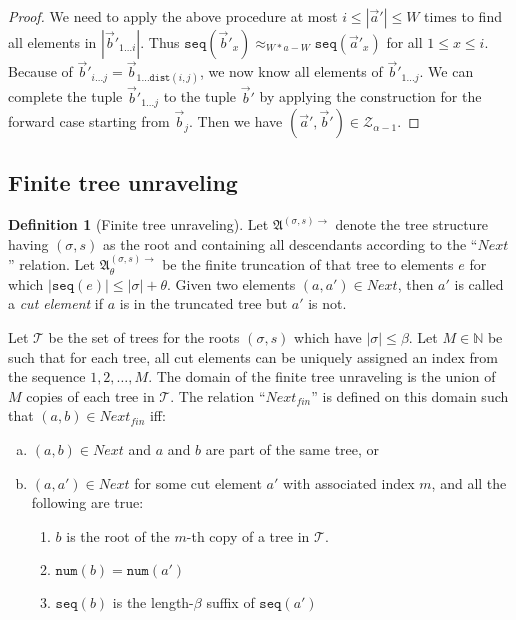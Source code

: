 \documentclass[draft]{scrartcl}
\theoremstyle{definition}
\newtheorem{definition}[theorem]{Definition}
\newcommand{\seq}[1]{\mathtt{seq}({#1})}
\newcommand{\num}[1]{\mathtt{num}({#1})}
\newcommand{\dist}[2]{\mathtt{dist}({#1},{#2})}
\newcommand{\sij}{_{i\ldots{}j}}
\begin{document}
\begin{proof}
  We need to apply the above procedure at most $i \le |\overrightarrow{a}'| \le W$ times to find all elements in $|\overrightarrow{b}'_{1\ldots{}i}|$.
  Thus $\seq{\overrightarrow{b}'_{x}} \approx_{W*a - W} \seq{\overrightarrow{a}'_{x}}$ for all $1 \le x \le i$.
  Because of $\overrightarrow{b}'\sij = \overrightarrow{b}_{1\ldots{}\dist{i}{j}}$, we now know all elements of $\overrightarrow{b}'_{1\ldots{}j}$.
  We can complete the tuple $\overrightarrow{b}'_{1\ldots{}j}$ to the tuple $\overrightarrow{b}'$ by applying the construction for the forward case starting from $\overrightarrow{b}_{j}$.
  Then we have $(\overrightarrow{a}', \overrightarrow{b}') \in \mathcal{Z}_{\alpha-1}$.
\end{proof}

\subsection{Finite tree unraveling}

\begin{definition}[Finite tree unraveling]
  Let $\mathfrak{A}^{(\sigma, s) \rightarrow}$ denote the tree structure having $(\sigma, s)$ as the root and containing all descendants according to the ``$\mathit{Next}$'' relation.
  Let $\mathfrak{A}^{(\sigma, s) \rightarrow}_{\theta}$ be the finite truncation of that tree to elements $e$ for which $|\seq{e}| \le |\sigma| + \theta$.
  Given two elements $(a, a') \in \mathit{Next}$, then $a'$ is called a \emph{cut element} if $a$ is in the truncated tree but $a'$ is not.

  Let $\mathcal{T}$ be the set of trees for the roots $(\sigma, s)$ which have $|\sigma| \le \beta$.
  Let $M \in \mathbb{N}$ be such that for each tree, all cut elements can be uniquely assigned an index from the sequence $1, 2, \ldots, M$.
  The domain of the finite tree unraveling is the union of $M$ copies of each tree in $\mathcal{T}$.
  The relation ``$\mathit{Next}_{fin}$'' is defined on this domain such that $(a, b) \in \mathit{Next}_{fin}$ iff:
  \begin{enumerate}[(a)]
    \item $(a, b) \in \mathit{Next}$ and $a$ and $b$ are part of the same tree, or
    \item $(a, a') \in \mathit{Next}$ for some cut element $a'$ with associated index $m$, and all the following are true:
        \begin{enumerate}[(1)]
          \item $b$ is the root of the $m$-th copy of a tree in $\mathcal{T}$.
          \item $\num{b} = \num{a'}$
          \item $\seq{b}$ is the length-$\beta$ suffix of $\seq{a'}$
        \end{enumerate}
  \end{enumerate}
\end{definition}
\end{document}
